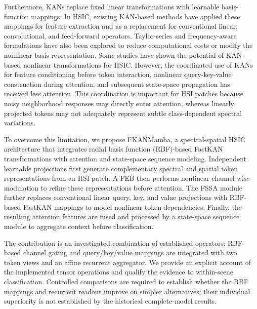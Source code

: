 \documentclass{revision_assets/ieeeaccess_revision}
\newif\ifrevisionhighlights
\newenvironment{revision}{\ifrevisionhighlights\begin{shaded*}\fi}{\ifrevisionhighlights\end{shaded*}\fi}
\begin{document}
Furthermore, KANs replace fixed linear transformations with learnable basis-function mappings. In HSIC, existing KAN-based methods have applied these mappings for feature extraction and as a replacement for conventional linear, convolutional, and feed-forward operators. Taylor-series and frequency-aware formulations have also been explored to reduce computational costs or modify the nonlinear basis representation. Some studies \cite{ref24,ref25,ref26,ref27,ref28} have shown the potential of KAN-based nonlinear transformations for HSIC. However, the coordinated use of KANs for feature conditioning before token interaction, nonlinear query-key-value construction during attention, and subsequent state-space propagation has received less attention. This coordination is important for HSI patches because noisy neighborhood responses may directly enter attention, whereas linearly projected tokens may not adequately represent subtle class-dependent spectral variations.

To overcome this limitation, we propose FKANMamba, a spectral-spatial HSIC architecture that integrates radial basis function (RBF)-based FastKAN transformations with attention and state-space sequence modeling. Independent learnable projections first generate complementary spectral and spatial token representations from an HSI patch. A FEB then performs nonlinear channel-wise modulation to refine these representations before attention. The FSSA module further replaces conventional linear query, key, and value projections with RBF-based FastKAN mappings to model nonlinear token dependencies. Finally, the resulting attention features are fused and processed by a state-space sequence module to aggregate context before classification.

\begin{revision}
The contribution is an investigated combination of established operators: RBF-based channel gating and query/key/value mappings are integrated with two token views and an affine recurrent aggregator. We provide an explicit account of the implemented tensor operations and qualify the evidence to within-scene classification. Controlled comparisons are required to establish whether the RBF mappings and recurrent readout improve on simpler alternatives; their individual superiority is not established by the historical complete-model results.
\end{revision}
\end{document}
